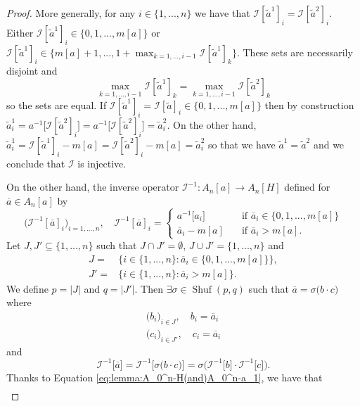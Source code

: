 \documentclass[a4paper,11pt,twoside]{article}
\numberwithin{equation}{section}
\theoremstyle{plain}
\newcommand{\cI}{\mathcal{I}}
\DeclareMathOperator{\Shuf}{Shuf}
\newcommand{\1}{\mathbbm{1}}
\begin{document}
\begin{proof}
		More generally, for any $i\in \{1, ..., n\}$ we have that $\cI[\tilde{a}^1]_i = \cI[\tilde{a}^2]_i$. Either $\cI[\tilde{a}^1]_i \in \{0, 1, ..., m[a]\}$ or $\cI[\tilde{a}^1]_i \in \{m[a] + 1, ..., 1+ \max_{k=1, ..., i-1} \cI[\tilde{a}^1]_k \}$. These sets are necessarily disjoint and 
		$$
		\max_{k=1, ..., i-1} \cI[\tilde{a}^1]_k = \max_{k=1, ..., i-1} \cI[\tilde{a}^2]_k
		$$
		so the sets are equal. If $\cI[\tilde{a}^1]_i = \cI[\tilde{a}]_i \in \{0, 1, ..., m[a]\}$ then by construction $\tilde{a}_i^1 = a^{-1}\big[ \cI[\tilde{a}^2]_i \big] = a^{-1}\big[ \cI[\tilde{a}^2]_i \big] = \tilde{a}_i^2$. On the other hand, $\tilde{a}_i^1 = \cI[\tilde{a}^1]_i - m[a] = \cI[\tilde{a}^2]_i - m[a] = \tilde{a}_i^2$ so that we have $\tilde{a}^1 = \tilde{a}^2$ and we conclude that $\cI$ is injective. 
		
		On the other hand, the inverse operator $\cI^{-1}: A_n[a] \to A_n[H]$ defined for $\overline{a} \in A_n[a]$ by
		\begin{equation}
			\label{eq:lemma:A_0^n-H(and)A_0^n-a_1}
			\big( \cI^{-1} [\overline{a}]_i \big)_{i=1, ..., n}, \quad \cI^{-1} [\overline{a}]_i = 
			\begin{cases}
				a^{-1}\big[ a_i \big] \quad& \mbox{if $\overline{a}_i \in \big\{ 0, 1, ..., m[a] \big\}$}
				\\
				\overline{a}_i - m[a] \quad& \mbox{if $\overline{a}_i> m[a]$.}
			\end{cases}
		\end{equation}
		Let $J, J' \subseteq \{1, ..., n\}$ such that $J \cap J' = \emptyset$, $J \cup J' = \{1, ..., n\}$ and
		\begin{align*}
			J =& \big\{ i\in \{1, ..., n\}: \overline{a}_i \in \{0, 1, ..., m[a]\} \big\}, 
			\\
			J' =& \big\{ i\in \{1, ..., n\}: \overline{a}_i > m[a] \big\}. 
		\end{align*}
		We define $p = |J|$ and $q = |J'|$. Then $\exists \sigma \in \Shuf(p, q)$ such that $\overline{a} = \sigma\big( b\cdot c\big)$ where
		\begin{align*}
			\big( b_i \big)_{i\in J}, \quad  b_i = \overline{a}_i
			\\
			\big( c_i \big)_{i \in J'}, \quad c_i = \overline{a}_i
		\end{align*}
		and
		$$
		\cI^{-1}\big[ \overline{a} \big] = \cI^{-1} \Big[ \sigma\big( b \cdot c \big) \Big] = \sigma\Big( \cI^{-1}\big[ b \big] \cdot \cI^{-1}\big[ c \big] \Big). 
		$$
		Thanks to Equation \eqref{eq:lemma:A_0^n-H(and)A_0^n-a_1}, we have that
		\begin{align*}

\end{align*}
\end{proof}
\end{document}

